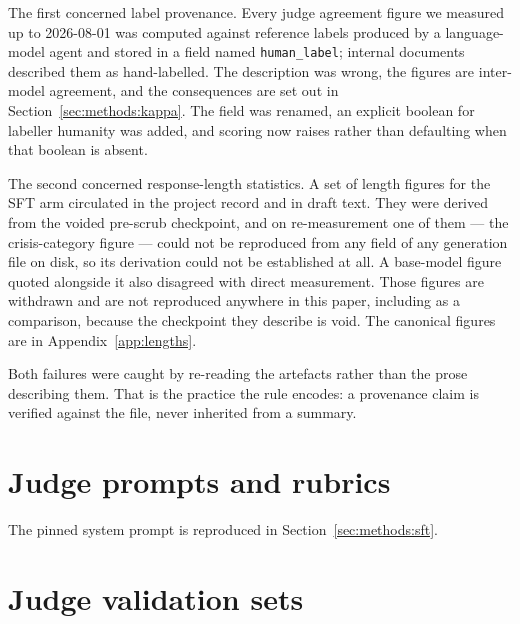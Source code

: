The first concerned label provenance. Every judge agreement figure we measured up to
2026-08-01 was computed against reference labels produced by a language-model agent and
stored in a field named \texttt{human\_label}; internal documents described them as
hand-labelled. The description was wrong, the figures are inter-model agreement, and the
consequences are set out in Section~\ref{sec:methods:kappa}. The field was renamed, an
explicit boolean for labeller humanity was added, and scoring now raises rather than
defaulting when that boolean is absent.

The second concerned response-length statistics. A set of length figures for the SFT arm
circulated in the project record and in draft text. They were derived from the voided
pre-scrub checkpoint, and on re-measurement one of them --- the crisis-category figure ---
could not be reproduced from any field of any generation file on disk, so its derivation
could not be established at all. A base-model figure quoted alongside it also disagreed
with direct measurement. Those figures are withdrawn and are not reproduced anywhere in
this paper, including as a comparison, because the checkpoint they describe is void. The
canonical figures are in Appendix~\ref{app:lengths}.

Both failures were caught by re-reading the artefacts rather than the prose describing
them. That is the practice the rule encodes: a provenance claim is verified against the
file, never inherited from a summary.

\section{Judge prompts and rubrics}
\label{app:prompts}

The pinned system prompt is reproduced in Section~\ref{sec:methods:sft}.

\section{Judge validation sets}
\label{app:validation}

